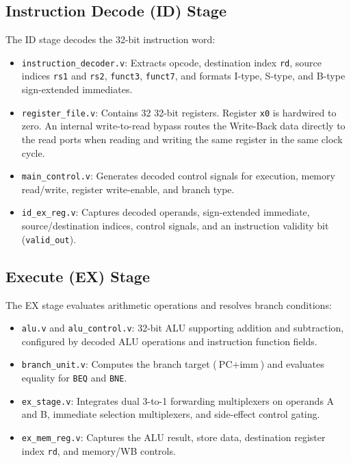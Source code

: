 \documentclass[conference]{IEEEtran}
\begin{document}
\subsection{Instruction Decode (ID) Stage}
The ID stage decodes the 32-bit instruction word:
\begin{itemize}
    \item \texttt{instruction\_decoder.v}: Extracts opcode, destination index \texttt{rd}, source indices \texttt{rs1} and \texttt{rs2}, \texttt{funct3}, \texttt{funct7}, and formats I-type, S-type, and B-type sign-extended immediates.
    \item \texttt{register\_file.v}: Contains 32 32-bit registers. Register \texttt{x0} is hardwired to zero. An internal write-to-read bypass routes the Write-Back data directly to the read ports when reading and writing the same register in the same clock cycle.
    \item \texttt{main\_control.v}: Generates decoded control signals for execution, memory read/write, register write-enable, and branch type.
    \item \texttt{id\_ex\_reg.v}: Captures decoded operands, sign-extended immediate, source/destination indices, control signals, and an instruction validity bit (\texttt{valid\_out}).
\end{itemize}

\subsection{Execute (EX) Stage}
The EX stage evaluates arithmetic operations and resolves branch conditions:
\begin{itemize}
    \item \texttt{alu.v} and \texttt{alu\_control.v}: 32-bit ALU supporting addition and subtraction, configured by decoded ALU operations and instruction function fields.
    \item \texttt{branch\_unit.v}: Computes the branch target ($\text{PC} + \text{imm}$) and evaluates equality for \texttt{BEQ} and \texttt{BNE}.
    \item \texttt{ex\_stage.v}: Integrates dual 3-to-1 forwarding multiplexers on operands A and B, immediate selection multiplexers, and side-effect control gating.
    \item \texttt{ex\_mem\_reg.v}: Captures the ALU result, store data, destination register index \texttt{rd}, and memory/WB controls.
\end{itemize}
\end{document}
